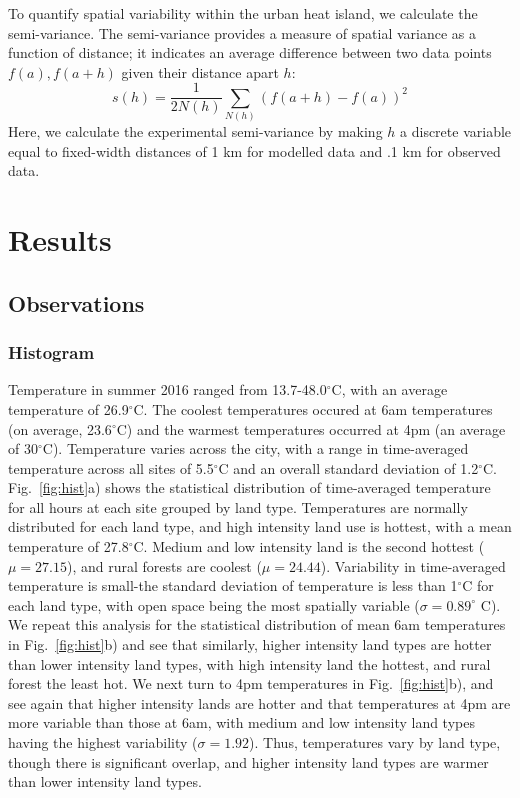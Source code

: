 \documentclass[draft,linenumbers]{agujournal}
\begin{document}
To quantify spatial variability within the urban heat island, we calculate the semi-variance. The semi-variance provides a measure of spatial variance as a function of distance; it indicates an average difference between two data points $f(a), f(a+h)$ given their distance apart $h$: 
$$ s(h) = \frac{1}{2 N(h)} \sum _{N(h)} \left(f(a+h) -f(a)\right)^2 $$
Here, we calculate the experimental semi-variance by making $h$ a discrete variable equal to fixed-width distances of 1 km for modelled data and .1 km for observed data. 


\section{Results}\label{sec:results} 
\subsection{Observations}
\subsubsection{Histogram}
Temperature in summer 2016 ranged from 13.7-48.0$^\circ$C, with an average temperature of 26.9$^\circ$C. The coolest temperatures occured at 6am temperatures (on average, 23.6$^\circ$C) and the warmest temperatures occurred at 4pm (an average of 30$^\circ$C). 
Temperature varies across the city, with a range in time-averaged temperature across all sites of 5.5$^\circ$C and an overall standard deviation of 1.2$^\circ$C. Fig.~\ref{fig:hist}a) shows the statistical distribution of time-averaged temperature for all hours at each site grouped by land type. Temperatures are normally distributed for each land type, and high intensity land use is hottest, with a mean temperature of 27.8$^\circ$C. Medium and low intensity land is the second hottest ($\mu = 27.15$), and rural forests are coolest ($\mu = 24.44$). 
Variability in time-averaged temperature is small-the standard deviation of temperature is less than 1$^\circ$C for each land type, with open space being the most spatially variable ($\sigma = 0.89^\circ$ C). We repeat this analysis for the statistical distribution of mean 6am temperatures in Fig.~\ref{fig:hist}b) and see that similarly, higher intensity land types are hotter than lower intensity land types, with high intensity land the hottest, and rural forest the least hot. We next turn to 4pm temperatures in Fig.~\ref{fig:hist}b), and see again that higher intensity lands are hotter and that temperatures at 4pm are more variable than those at 6am, with medium and low intensity land types having the highest variability ($\sigma = 1.92$). 
Thus, temperatures vary by land type, though there is significant overlap, and higher intensity land types are warmer than lower intensity land types. 
\end{document}
